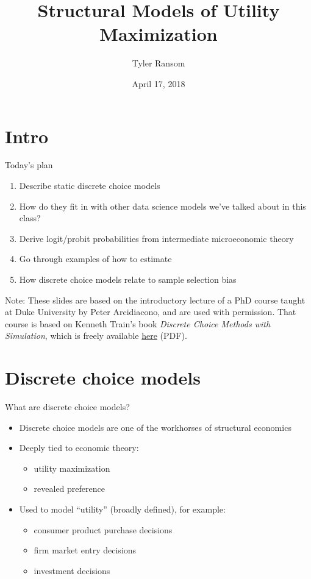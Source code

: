 \documentclass[english,aspectratio=169,12pt,xcolor=dvipsnames]{beamer}
\title{Structural Models of Utility Maximization}
\author{Tyler Ransom}
\institute[OU Econ]{\normalsize{University of Oklahoma, Dept. of Economics}}
\date{April 17, 2018}
\begin{document}
{
\frame[noframenumbering]{\titlepage}
}




\section{Intro}
\begin{frame}{Today's plan}
\begin{enumerate}
\item Describe static discrete choice models
\item How do they fit in with other data science models we've talked about in this class?
\item Derive logit/probit probabilities from intermediate microeconomic theory
\item Go through examples of how to estimate
\item How discrete choice models relate to sample selection bias
\end{enumerate}

\bigskip{}
\bigskip{}

\footnotesize{Note: These slides are based on the introductory lecture of a PhD course taught at Duke University by Peter Arcidiacono, and are used with permission. That course is based on Kenneth Train's book \emph{Discrete Choice Methods with Simulation}, which is freely available \href{https://eml.berkeley.edu/books/train1201.pdf}{here} (PDF).}
\end{frame}



\section{Discrete choice models}
\begin{frame}{What are discrete choice models?}
\begin{itemize}
\item Discrete choice models are one of the workhorses of structural economics
\item Deeply tied to economic theory:
    \begin{itemize}
    \item utility maximization
    \item revealed preference
    \end{itemize}
\item Used to model ``utility'' (broadly defined), for example:
    \begin{itemize}
    \item consumer product purchase decisions
    \item firm market entry decisions
    \item investment decisions
    \end{itemize}
\end{itemize}
\end{frame}
\end{document}
